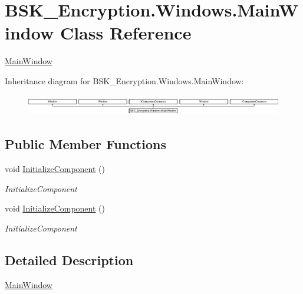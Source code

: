 \hypertarget{class_b_s_k___encryption_1_1_windows_1_1_main_window}{}\section{B\+S\+K\+\_\+\+Encryption.\+Windows.\+Main\+Window Class Reference}
\label{class_b_s_k___encryption_1_1_windows_1_1_main_window}


\mbox{\hyperlink{class_b_s_k___encryption_1_1_windows_1_1_main_window}{Main\+Window}}  


Inheritance diagram for B\+S\+K\+\_\+\+Encryption.\+Windows.\+Main\+Window\+:\begin{figure}[H]
\begin{center}
\leavevmode
\includegraphics[height=0.925620cm]{class_b_s_k___encryption_1_1_windows_1_1_main_window}
\end{center}
\end{figure}
\subsection*{Public Member Functions}
\begin{DoxyCompactItemize}
\item 
void \mbox{\hyperlink{class_b_s_k___encryption_1_1_windows_1_1_main_window_ad2eaef015028e1367f97c86e7c9878da}{Initialize\+Component}} ()
\begin{DoxyCompactList}\small\item\em Initialize\+Component \end{DoxyCompactList}\item 
void \mbox{\hyperlink{class_b_s_k___encryption_1_1_windows_1_1_main_window_ad2eaef015028e1367f97c86e7c9878da}{Initialize\+Component}} ()
\begin{DoxyCompactList}\small\item\em Initialize\+Component \end{DoxyCompactList}\end{DoxyCompactItemize}


\subsection{Detailed Description}
\mbox{\hyperlink{class_b_s_k___encryption_1_1_windows_1_1_main_window}{Main\+Window}} 

